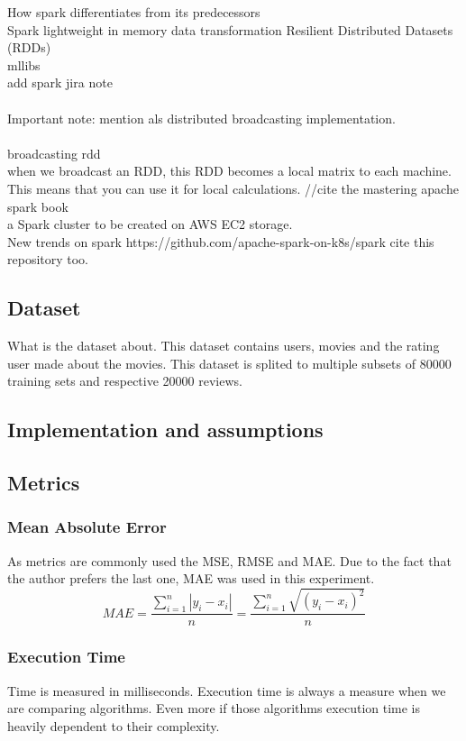 How spark differentiates from its predecessors\\
Spark lightweight in memory data transformation 
Resilient Distributed Datasets (RDDs) \\
mllibs\\
add spark jira note \\\\
Important note: mention als distributed broadcasting implementation. 
\\\\
broadcasting rdd \\ when we broadcast an RDD, this RDD becomes a local matrix to each machine. This means that you can use it for local calculations.
//cite the mastering apache spark book
\cite{ApacheSpark:1} \\
a Spark cluster to be created on AWS EC2 storage.\\
New trends on spark https://github.com/apache-spark-on-k8s/spark cite this repository too.
\subsection{Dataset}
What is the dataset about. This dataset contains users, movies and the rating user made about the movies.
This dataset is splited to multiple subsets of 80000 training sets and respective 20000 reviews.
\cite{MovieLens:3}

\subsection{Implementation and assumptions}
\subsection{Metrics}
\subsubsection{Mean Absolute Error}
As metrics are commonly used the MSE, RMSE and MAE. Due to the fact that the author prefers the last one, MAE was used in this experiment.
\begin{equation}
MAE = \frac{\sum_{i=1}^{n}{|y_{i}-x_{i}|} }{n} = \frac{\sum_{i=1}^{n}\sqrt{{(y_{i}-x_{i})}^{2}}}{n}
\end{equation}
\subsubsection{Execution Time}
Time is measured in milliseconds.
Execution time is always a measure when we are comparing algorithms. Even more if those algorithms execution time is heavily dependent to their complexity.
